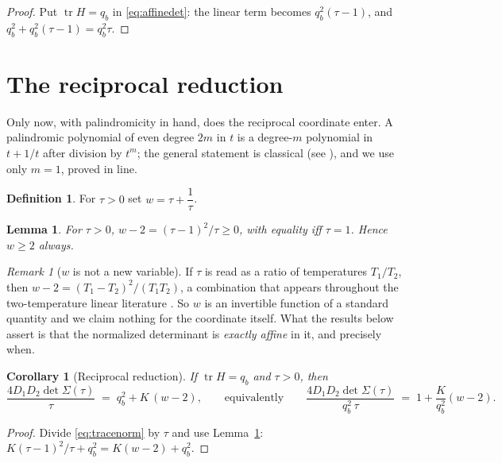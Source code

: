 \documentclass[11pt]{article}
\theoremstyle{plain}
\newtheorem{lemma}[theorem]{Lemma}
\newtheorem{corollary}[theorem]{Corollary}
\theoremstyle{definition}
\newtheorem{definition}[theorem]{Definition}
\theoremstyle{remark}
\newtheorem{remark}[theorem]{Remark}
\newcommand{\tr}{\operatorname{tr}}
\newcommand{\Sig}{\Sigma}
\begin{document}
\begin{proof}
Put $\tr H=q_b$ in \eqref{eq:affinedet}: the linear term becomes $q_b^2(\tau-1)$, and
$q_b^2+q_b^2(\tau-1)=q_b^2\tau$.
\end{proof}

\section{The reciprocal reduction}\label{sec:thm3}

Only now, with palindromicity in hand, does the reciprocal coordinate enter. A palindromic
polynomial of even degree $2m$ in $t$ is a degree-$m$ polynomial in $t+1/t$ after division by
$t^m$; the general statement is classical (see \cite[\S2]{Vieira2019}), and we use only $m=1$,
proved in line.

\begin{definition}
For $\tau>0$ set $w=\tau+\dfrac1\tau$.
\end{definition}

\begin{lemma}\label{lem:wge2}
For $\tau>0$, $w-2=(\tau-1)^2/\tau\ge0$, with equality iff $\tau=1$. Hence $w\ge2$ always.
\end{lemma}

\begin{remark}[$w$ is not a new variable]\label{rem:wknown}
If $\tau$ is read as a ratio of temperatures $T_1/T_2$, then
$w-2=(T_1-T_2)^2/(T_1T_2)$, a combination that appears throughout the two-temperature linear
literature \cite{FilligerReimann2007,DotsenkoEtAl2013,GodrecheLuck2019}. So $w$ is an invertible
function of a standard quantity and we claim nothing for the coordinate itself. What the results
below assert is that the normalized determinant is \emph{exactly affine} in it, and precisely
when.
\end{remark}

\begin{corollary}[Reciprocal reduction]\label{cor:reciprocal}
If $\tr H=q_b$ and $\tau>0$, then
\begin{equation}
  \frac{4D_1D_2\det\Sig(\tau)}{\tau} \;=\; q_b^2+K\,(w-2),
  \qquad\text{equivalently}\qquad
  \frac{4D_1D_2\det\Sig(\tau)}{q_b^2\,\tau} \;=\; 1+\frac{K}{q_b^2}(w-2). \label{eq:reciprocal}
\end{equation}
\end{corollary}

\begin{proof}
Divide \eqref{eq:tracenorm} by $\tau$ and use Lemma~\ref{lem:wge2}:
$K(\tau-1)^2/\tau+q_b^2=K(w-2)+q_b^2$.
\end{proof}
\end{document}
